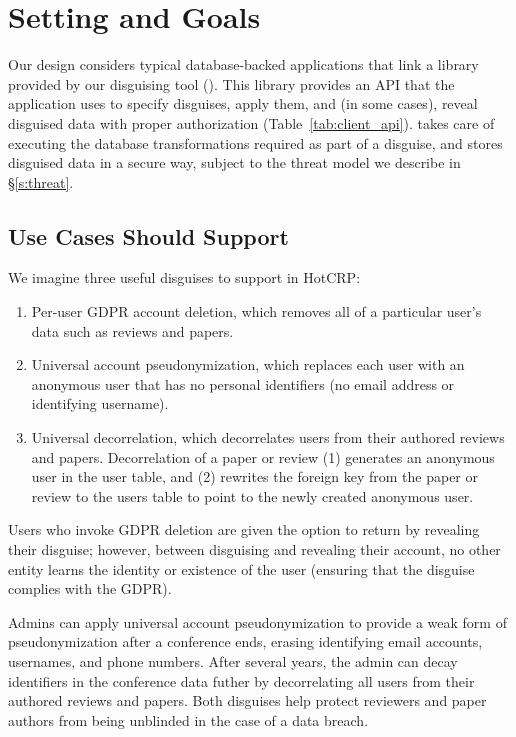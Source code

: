 \section{Setting and Goals}
Our design considers typical database-backed applications that link a library provided by our disguising
tool (\sys).
%
This library provides an API that the application uses to specify disguises, apply them, and (in some
cases), reveal disguised data with proper authorization (Table~\ref{tab:client_api}).
%
\sys takes care of executing the database transformations required as part of a disguise, and stores
disguised data in a secure way, subject to the threat model we describe in \S\ref{s:threat}.

\subsection{Use Cases \sys Should Support}

We imagine three useful disguises to support in HotCRP: 
\begin{enumerate}
    \item Per-user GDPR account deletion, which
        removes all of a particular user's data such as reviews and papers.
        \item Universal account pseudonymization, which replaces each user with an anonymous user
            that has no personal identifiers (\eg no email address or identifying username).
        \item Universal decorrelation, which decorrelates users from
            their authored reviews and papers. Decorrelation of a paper or review (1) generates an
            anonymous user in the user table, and (2) rewrites the foreign key from the paper or review
            to the users table to point to the newly created anonymous user.
\end{enumerate}

Users who invoke GDPR deletion are given the option to return by revealing their disguise; however,
between disguising and revealing their account, no other entity learns the identity or existence of
the user (ensuring that the disguise complies with the GDPR).

Admins can apply universal account pseudonymization to provide a weak form of pseudonymization after a
conference ends, erasing \eg identifying email accounts, usernames, and phone numbers. 
After several years, the admin can decay identifiers in the conference data futher by decorrelating
all users from their authored reviews and papers. Both disguises help protect reviewers and paper authors
from being unblinded in the case of a data breach.

